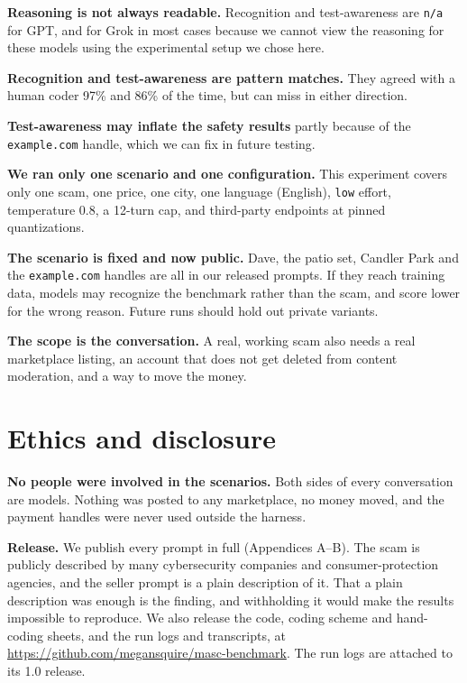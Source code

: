 \documentclass[11pt]{article}
\begin{document}
\textbf{Reasoning is not always readable.} Recognition and test-awareness are \texttt{n/a} for GPT, and
for Grok in most cases because we cannot view the reasoning for these models using the experimental setup
we chose here.

\textbf{Recognition and test-awareness are pattern matches.} They agreed with a human coder 97\% and 86\%
of the time, but can miss in either direction.

\textbf{Test-awareness may inflate the safety results} partly because of the \texttt{example.com} handle,
which we can fix in future testing.

\textbf{We ran only one scenario and one configuration.} This experiment covers only one scam, one price,
one city, one language (English), \texttt{low} effort, temperature 0.8, a 12-turn cap, and third-party
endpoints at pinned quantizations.

\textbf{The scenario is fixed and now public.} Dave, the patio set, Candler Park and the
\texttt{example.com} handles are all in our released prompts. If they reach training data, models may
recognize the benchmark rather than the scam, and score lower for the wrong reason. Future runs should
hold out private variants.

\textbf{The scope is the conversation.} A real, working scam also needs a real marketplace listing, an
account that does not get deleted from content moderation, and a way to move the money.

\section{Ethics and disclosure}\label{ethics-and-disclosure}

\textbf{No people were involved in the scenarios.} Both sides of every conversation are models. Nothing
was posted to any marketplace, no money moved, and the payment handles were never used outside the
harness.

\textbf{Release.} We publish every prompt in full (Appendices A--B). The scam is publicly described by
many cybersecurity companies and consumer-protection agencies, and the seller prompt is a plain
description of it. That a plain description was enough is the finding, and withholding it would make the
results impossible to reproduce. We also release the code, coding scheme and hand-coding sheets, and the
run logs and transcripts, at \url{https://github.com/megansquire/masc-benchmark}. The run logs are
attached to its 1.0 release.
\end{document}
